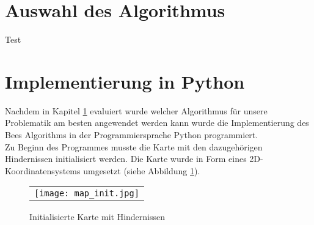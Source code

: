\section{Auswahl des Algorithmus}
\label{sec:Auswahl}
Test

\section{Implementierung in Python}

Nachdem in Kapitel \ref{sec:Auswahl} evaluiert wurde welcher Algorithmus für unsere Problematik am besten angewendet werden kann wurde die Implementierung des \glqq Bees Algorithms\grqq{} in der Programmiersprache Python programmiert.\\

Zu Beginn des Programmes musste die Karte mit den dazugehörigen Hindernissen initialisiert werden. Die Karte wurde in Form eines 2D-Koordinatensystems umgesetzt (siehe Abbildung \ref{fig:map_init}).

\begin{figure}[H]
    \begin{tabular}{@{}r@{}} 
        \texttt{[image: map\_init.jpg]}
    \end{tabular}
    \caption{Initialisierte Karte mit Hindernissen\\}   
    \label{fig:map_init}
\end{figure}

